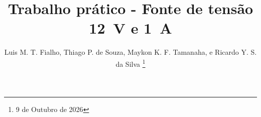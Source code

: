 \documentclass[journal,twoside,web]{ieeecolor}
\begin{document}
\title{\vspace*{2cm}Trabalho prático - Fonte de tensão 12~V e 1~A}
\author{Luis M. T. Fialho, Thiago P. de Souza, Maykon K. F. Tamanaha, e Ricardo Y. S. da Silva
\thanks{9 de Outubro de 2026}}

\maketitle









\FloatBarrier



\end{document}
